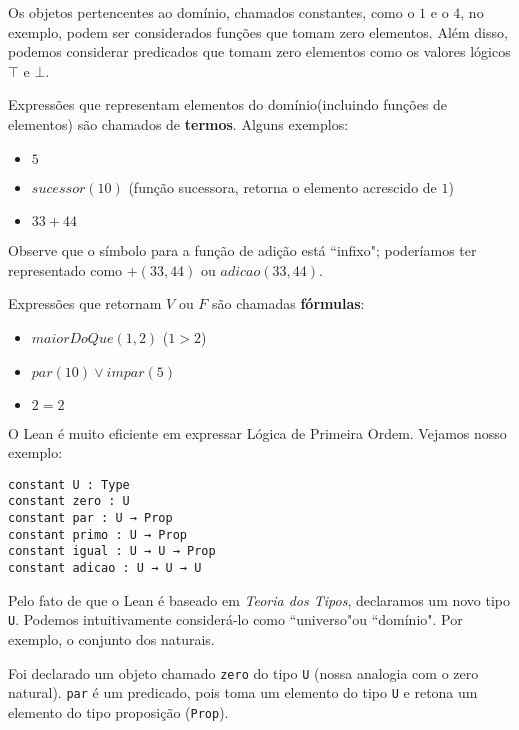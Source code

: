         Os objetos pertencentes ao domínio, chamados constantes, como o $1$ e o $4$, no exemplo, podem ser considerados funções que tomam zero elementos. Além disso, podemos considerar predicados que tomam zero elementos como os valores lógicos $\top$ e $\bot$.

        Expressões que representam elementos do domínio(incluindo funções de elementos) são chamados de \textbf{termos}. Alguns exemplos:

        \begin{itemize}
            \item $5$
            \item $sucessor(10)$ (função sucessora, retorna o elemento acrescido de $1$)
            \item $33+44$
        \end{itemize}

        Observe que o símbolo para a função de adição está ``infixo"; poderíamos ter representado como $+(33, 44)$ ou $adicao(33, 44)$.
        
        Expressões que retornam $V$ ou $F$ são chamadas \textbf{fórmulas}:

        \begin{itemize}
            \item $maiorDoQue(1,2)$ ($1 > 2$)
            \item $par(10) \lor impar(5)$
            \item $2=2$
        \end{itemize}

        O Lean é muito eficiente em expressar Lógica de Primeira Ordem. Vejamos nosso exemplo:

        \begin{lstlisting}
constant U : Type
constant zero : U
constant par : U → Prop
constant primo : U → Prop
constant igual : U → U → Prop
constant adicao : U → U → U
\end{lstlisting}

        Pelo fato de que o Lean é baseado em \textit{Teoria dos Tipos}, declaramos um novo tipo \lstinline{U}. Podemos intuitivamente considerá-lo como ``universo"\space ou ``domínio". Por exemplo, o conjunto dos naturais.

        Foi declarado um objeto chamado \lstinline{zero} do tipo \lstinline{U} (nossa analogia com o zero natural).
        \lstinline{par} é um predicado, pois toma um elemento do tipo \lstinline{U} e retona um elemento do tipo proposição (\lstinline{Prop}).

